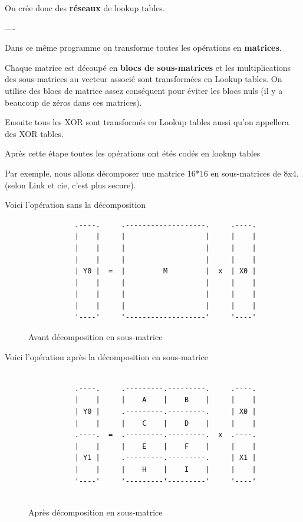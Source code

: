 \documentclass[a4paper,12pt]{article}
\begin{document}
On crée donc des \textbf{réseaux} de lookup tables.

----

Dans ce même programme on transforme toutes les opérations en \textbf{matrices}.

Chaque matrice est découpé en \textbf{blocs de sous-matrices} et les multiplications des sous-matrices au vecteur associé sont transformées en Lookup tables. On utilise des blocs de matrice assez conséquent pour éviter les blocs nuls (il y a beaucoup de zéros dans ces matrices).

Ensuite tous les XOR sont transformés en Lookup tables aussi qu'on appellera des XOR tables.

Après cette étape toutes les opérations ont étés codés en lookup tables

Par exemple, nous allons décomposer une matrice 16*16 en sous-matrices de 8x4. (selon Link et cie, c'est plus secure).

Voici l'opération sans la décomposition

\begin{figure}[h]
\begin{verbatim}
           .----.     .-------------------.     .----.
           |    |     |                   |     |    |
           |    |     |                   |     |    |
           |    |     |                   |     |    |
           | Y0 |  =  |         M         |  x  | X0 |
           |    |     |                   |     |    |
           |    |     |                   |     |    |
           |    |     |                   |     |    |
           '----'     '-------------------'     '----'

\end{verbatim}
\caption{Avant décomposition en sous-matrice}
\label{fig:ascii-box}
\end{figure}

\clearpage

Voici l'opération après la décomposition en sous-matrice

\begin{figure}[h]
\begin{verbatim}

           .----.     .---------.---------.     .----.
           |    |     |    A    |    B    |     |    |
           | Y0 |     .---------.---------.     | X0 |
           |    |     |    C    |    D    |     |    |
           .----.  =  .---------.---------.  x  .----.
           |    |     |    E    |    F    |     |    |
           | Y1 |     .---------.---------.     | X1 |
           |    |     |    H    |    I    |     |    |
           '----'     '---------'---------'     '----'
           
\end{verbatim}
\caption{Après décomposition en sous-matrice}
\label{fig:ascii-box}
\end{figure}
\end{document}
